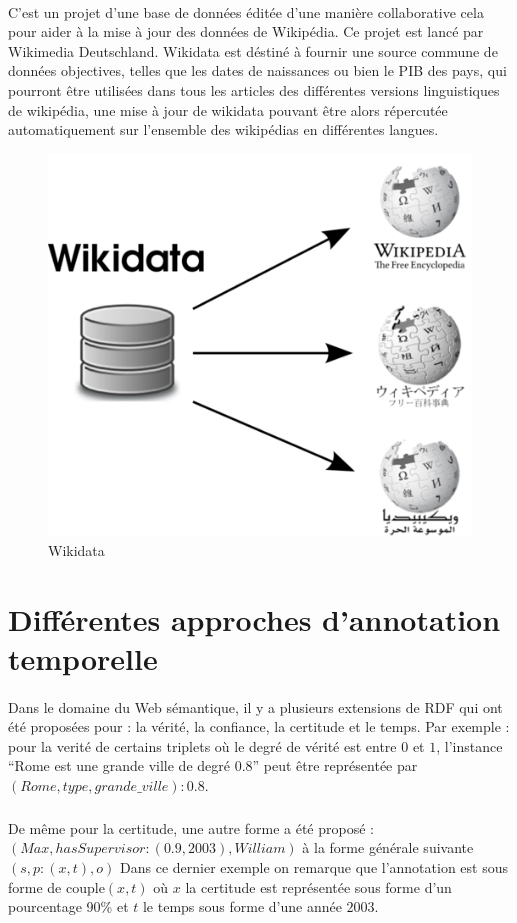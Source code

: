 \documentclass[12pt,a4]{report}
\begin{document}
\paragraph{}
C'est un projet d'une base de données éditée d'une manière collaborative cela pour aider à la mise à jour des données de Wikipédia. Ce projet est lancé par Wikimedia Deutschland. Wikidata est déstiné à fournir une source commune de données objectives, telles que les dates de naissances ou bien le PIB des pays, qui pourront être utilisées dans tous les articles des différentes versions linguistiques de wikipédia, une mise à jour de wikidata  pouvant être alors répercutée automatiquement sur l'ensemble des wikipédias en différentes langues.   
\begin{figure}[H]
\centering
\includegraphics[width=12cm]{wikidatawikipedia.png}
\caption{Wikidata}
\end{figure}

\section{Différentes approches d'annotation temporelle}			
\paragraph{}
Dans le domaine du Web sémantique, il y a plusieurs extensions de RDF qui ont été proposées pour : la vérité, la confiance, la certitude et le temps.
Par exemple : pour la verité de certains triplets où le degré de vérité est entre $0$ et $1$, l’instance “Rome est une grande ville de degré 0.8” peut être représentée par $(Rome, type,grande{\_}ville) : 0.8$.
\subparagraph{}
De même pour la certitude, une autre forme a été proposé :
$(Max,hasSupervisor : (0.9,2003),William)$ à la forme générale suivante $(s, p : (x,t),o)$
\newline
Dans ce dernier exemple on remarque que l'annotation est sous forme de couple$(x, t)$ où $x$ la certitude est représentée sous forme d'un pourcentage 90\% et $t$ le temps sous forme d'une année $2003$.
\end{document}

